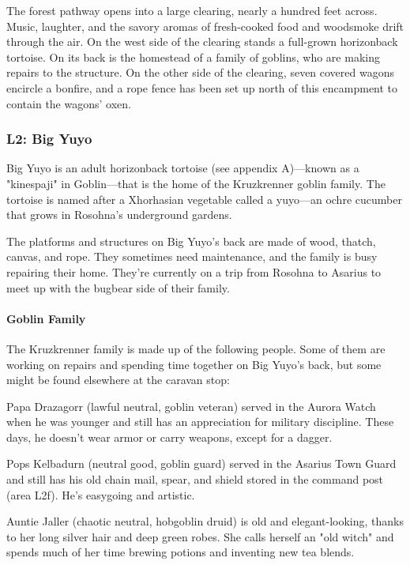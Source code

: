 \documentclass[10pt,a4paper,twoside,twocolumn,openany,nodeprecatedcode]{dndbook}
\begin{document}
\begin{DndReadAloud}{}
The forest pathway opens into a large clearing, nearly a hundred feet across. Music, laughter, and the savory aromas of fresh-cooked food and woodsmoke drift through the air. On the west side of the clearing stands a full-grown horizonback tortoise. On its back is the homestead of a family of goblins, who are making repairs to the structure. On the other side of the clearing, seven covered wagons encircle a bonfire, and a rope fence has been set up north of this encampment to contain the wagons' oxen.

\end{DndReadAloud}

\subsubsection{L2: Big Yuyo}
Big Yuyo is an adult horizonback tortoise (see appendix A)—known as a "kinespaji" in Goblin—that is the home of the Kruzkrenner goblin family. The tortoise is named after a Xhorhasian vegetable called a yuyo—an ochre cucumber that grows in Rosohna's underground gardens.

The platforms and structures on Big Yuyo's back are made of wood, thatch, canvas, and rope. They sometimes need maintenance, and the family is busy repairing their home. They're currently on a trip from Rosohna to Asarius to meet up with the bugbear side of their family.

\paragraph{Goblin Family}
The Kruzkrenner family is made up of the following people. Some of them are working on repairs and spending time together on Big Yuyo's back, but some might be found elsewhere at the caravan stop:

Papa Drazagorr (lawful neutral, goblin veteran) served in the Aurora Watch when he was younger and still has an appreciation for military discipline. These days, he doesn't wear armor or carry weapons, except for a dagger.

Pops Kelbadurn (neutral good, goblin guard) served in the Asarius Town Guard and still has his old chain mail, spear, and shield stored in the command post (area L2f). He's easygoing and artistic.

Auntie Jaller (chaotic neutral, hobgoblin druid) is old and elegant-looking, thanks to her long silver hair and deep green robes. She calls herself an "old witch" and spends much of her time brewing potions and inventing new tea blends.
\end{document}
